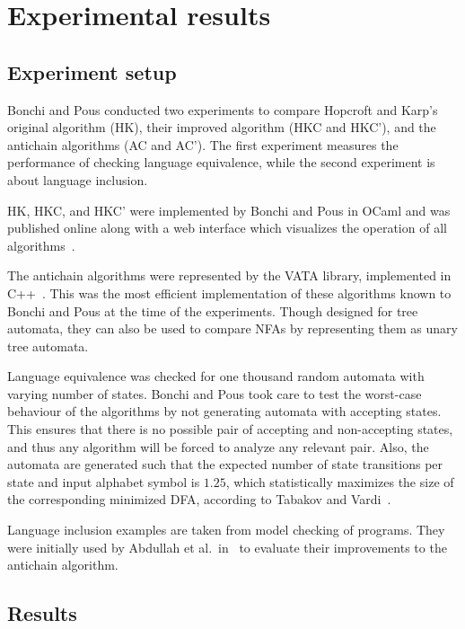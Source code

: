 \section{Experimental results}

\subsection{Experiment setup}

Bonchi and Pous conducted two experiments to compare Hopcroft and Karp's original
algorithm (HK), their improved algorithm (HKC and HKC'),
and the antichain algorithms (AC and AC').
The first experiment measures the performance of checking language equivalence,
while the second experiment is about language inclusion.

HK, HKC, and HKC' were implemented by Bonchi and Pous in OCaml and was published
online along with a web interface which visualizes the operation of all
algorithms~\cite{hkntonline}.

The antichain algorithms were represented by the VATA library,
implemented in C++~\cite{lengal2012vata}.
This was the most efficient implementation of these algorithms known to
Bonchi and Pous at the time of the experiments.
Though designed for tree automata, they can also be used to compare NFAs
by representing them as unary tree automata.

Language equivalence was checked for one thousand random automata with varying
number of states.
Bonchi and Pous took care to test the worst-case behaviour of the algorithms by
not generating automata with accepting states.
This ensures that there is no possible pair of accepting and non-accepting
states, and thus any algorithm will be forced to analyze any relevant pair.
Also, the automata are generated such that the expected number of
state transitions per state and input alphabet symbol is $1.25$, which
statistically maximizes the size of the corresponding minimized DFA, according
to Tabakov and Vardi~\cite{Tabakov2005}.

Language inclusion examples are taken from model checking of programs.
They were initially used by Abdullah et al.\ in~\cite{abdulla2010simulation}
to evaluate their improvements to the antichain algorithm.

\subsection{Results}



